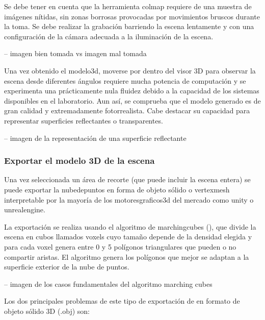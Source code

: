\documentclass[a4paper, 12pt, spanish, twoside]{article}
\begin{document}
Se debe tener en cuenta que la herramienta \gls{colmap} requiere de una muestra de imágenes nítidas, sin zonas borrosas provocadas por movimientos bruscos durante la toma. Se debe realizar la grabación barriendo la escena lentamente y con una configuración de la cámara adecuada a la iluminación de la escena. 

-- imagen bien tomada vs imagen mal tomada 

Una vez obtenido el \gls{modelo3d}, moverse por dentro del visor 3D para observar la escena desde diferentes ángulos requiere mucha potencia de computación y se experimenta una prácticamente nula fluidez debido a la capacidad de los sistemas disponibles en el laboratorio. Aun así, se comprueba que el modelo generado es de gran calidad y extremadamente fotorrealista. Cabe destacar su capacidad para representar superficies reflectantes o transparentes. 

-- imagen de la representación de una superficie reflectante 

\subsubsection{Exportar el modelo 3D de la escena} \label{sec:implementacion:instant-ngp:exportar}

Una vez seleccionada un área de recorte (que puede incluir la escena entera) se puede exportar la \gls{nubedepuntos} en forma de objeto sólido o \gls{vertexmesh} interpretable por la mayoría de los \gls{motoresgraficos3d} del mercado como \gls{unity} o \gls{unrealengine}. 

La exportación se realiza usando el algoritmo de \gls{marchingcubes} (\cite{lorensen-cline:marchingcubes}), que divide la escena en cubos llamados \glspl{voxel} cuyo tamaño depende de la densidad elegida y para cada \gls{voxel} genera entre 0 y 5 polígonos triangulares que pueden o no compartir aristas. El algoritmo genera los polígonos que mejor se adaptan a la superficie exterior de la nube de puntos. 

-- imagen de los casos fundamentales del algoritmo marching cubes 

Los dos principales problemas de este tipo de exportación de en formato de objeto sólido 3D (.obj) son: 
\end{document}
